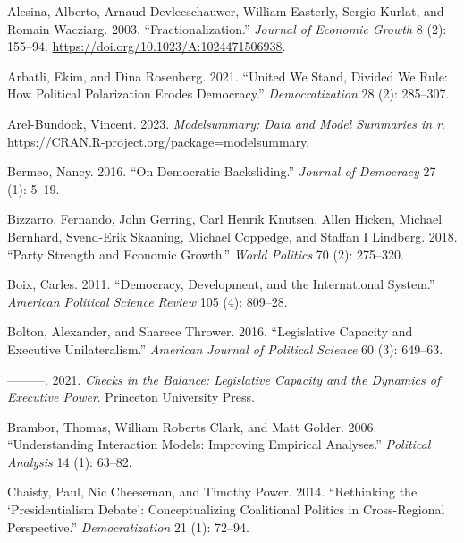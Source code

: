 \documentclass[
  letterpaper,
  DIV=11,
  numbers=noendperiod]{scrartcl}
\newlength{\cslhangindent}
\newenvironment{CSLReferences}[2] %
 {\begin{list}{}{%
  \setlength{\itemindent}{0pt}
  \setlength{\leftmargin}{0pt}
  \setlength{\parsep}{0pt}
  \ifodd #1
   \setlength{\leftmargin}{\cslhangindent}
   \setlength{\itemindent}{-1\cslhangindent}
  \fi
  \setlength{\itemsep}{#2\baselineskip}}}
 {\end{list}}
\begin{document}
\label{refs}
\begin{CSLReferences}{1}{0}
Alesina, Alberto, Arnaud Devleeschauwer, William Easterly, Sergio
Kurlat, and Romain Wacziarg. 2003. {``Fractionalization.''}
\emph{Journal of Economic Growth} 8 (2): 155--94.
\url{https://doi.org/10.1023/A:1024471506938}.

Arbatli, Ekim, and Dina Rosenberg. 2021. {``United We Stand, Divided We
Rule: How Political Polarization Erodes Democracy.''}
\emph{Democratization} 28 (2): 285--307.

Arel-Bundock, Vincent. 2023. \emph{Modelsummary: Data and Model
Summaries in r}. \url{https://CRAN.R-project.org/package=modelsummary}.

Bermeo, Nancy. 2016. {``On Democratic Backsliding.''} \emph{Journal of
Democracy} 27 (1): 5--19.

Bizzarro, Fernando, John Gerring, Carl Henrik Knutsen, Allen Hicken,
Michael Bernhard, Svend-Erik Skaaning, Michael Coppedge, and Staffan I
Lindberg. 2018. {``Party Strength and Economic Growth.''} \emph{World
Politics} 70 (2): 275--320.

Boix, Carles. 2011. {``Democracy, Development, and the International
System.''} \emph{American Political Science Review} 105 (4): 809--28.

Bolton, Alexander, and Sharece Thrower. 2016. {``Legislative Capacity
and Executive Unilateralism.''} \emph{American Journal of Political
Science} 60 (3): 649--63.

---------. 2021. \emph{Checks in the Balance: Legislative Capacity and
the Dynamics of Executive Power}. Princeton University Press.

Brambor, Thomas, William Roberts Clark, and Matt Golder. 2006.
{``Understanding Interaction Models: Improving Empirical Analyses.''}
\emph{Political Analysis} 14 (1): 63--82.

Chaisty, Paul, Nic Cheeseman, and Timothy Power. 2014. {``Rethinking the
{`Presidentialism Debate'}: Conceptualizing Coalitional Politics in
Cross-Regional Perspective.''} \emph{Democratization} 21 (1): 72--94.


\end{CSLReferences}
\end{document}
